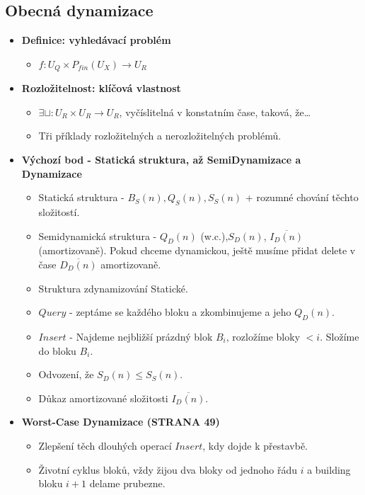 \documentclass[11pt,a4paper]{article}
\begin{document}
\subsection{Obecná dynamizace}
\begin{itemize}
    \item \textbf{Definice: vyhledávací problém}
    \begin{itemize}
        \item $f : U_Q \times P_{fin}(U_X) \rightarrow U_R$
    \end{itemize}
    \item \textbf{Rozložitelnost: klíčová vlastnost}
    \begin{itemize}
        \item $\exists \sqcup: U_R \times U_R \rightarrow U_R$, vyčíslitelná v konstatním čase, taková, že\dots
        \item Tři příklady rozložitelných a nerozložitelných problémů.
    \end{itemize}
    \item \textbf{Výchozí bod - Statická struktura, až SemiDynamizace a Dynamizace}
    \begin{itemize}
        \item Statická struktura - $B_S(n), Q_S(n), S_S(n)$ + rozumné chování těchto složitostí.
        \item Semidynamická struktura - $Q_D(n)$ (w.c.),$S_D(n)$, $\overline{I_D(n)}$ (amortizovaně). Pokud chceme dynamickou, ještě musíme přidat delete v čase $\overline{D_D(n)}$ amortizovaně.
        \item Struktura zdynamizování Statické.
        \item $Query$ - zeptáme se každého bloku a zkombinujeme a jeho $Q_D(n)$.
        \item $Insert$ - Najdeme nejbližší prázdný blok $B_i$, rozložíme bloky $<i$. Složíme do bloku $B_i$.
        \item Odvození, že $S_D(n) \leq S_S(n)$.
        \item Důkaz amortizované složitosti $\overline{I_D(n)}$.
    \end{itemize}
    \item \textbf{Worst-Case Dynamizace (STRANA 49)}
    \begin{itemize}
        \item Zlepšení těch dlouhých operací $Insert$, kdy dojde k přestavbě.
        \item Životní cyklus bloků, vždy žijou dva bloky od jednoho řádu $i$ a building bloku $i+1$ delame prubezne.

\end{itemize}
\end{itemize}
\end{document}
